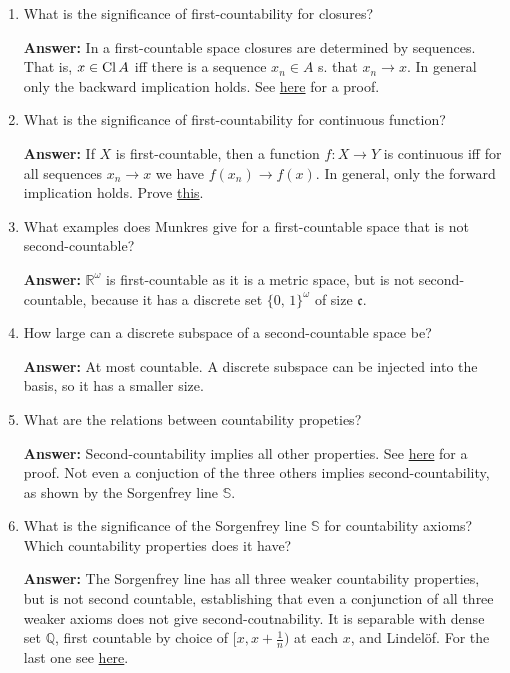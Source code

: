 \begin{enumerate}
    \item What is the significance of first-countability for closures?

    \textbf{Answer:} In a first-countable space closures are determined by sequences. That is, \( x \in \operatorname{Cl} A \) iff there is a sequence \( x_n \in A \) s. that \( x_n \to x \). In general only the backward implication holds. See \hyperlink{FirstCountableClosures}{here} for a proof.

    \item What is the significance of first-countability for continuous function?

    \textbf{Answer:} If \( X \) is first-countable, then a function \( f: X \to Y \) is continuous iff for all sequences \( x_n \to x \) we have \( f(x_n) \to f(x) \). In general, only the forward implication holds. Prove \hyperlink{FirstCountableContinuousFunctions}{this}.
    
    \item What examples does Munkres give for a first-countable space that is not second-countable?

        \textbf{Answer:} \( \mathbb{R}^\omega \) is first-countable as it is a metric space, but is not second-countable, because it has a discrete set \( \{ 0,\,1 \}^\omega \) of size \( \mathfrak{c} \).
    \item How large can a discrete subspace of a second-countable space be?
    
    \textbf{Answer:} At most countable. A discrete subspace can be injected into the basis, so it has a smaller size.
    \item What are the relations between countability propeties?

    \textbf{Answer:} Second-countability implies all other properties. See \hyperlink{MetrisableSpaceCountabilityProperties}{here} for a proof. Not even a conjuction of the three others implies second-countability, as shown by the Sorgenfrey line \( \mathbb{S} \).
    \item What is the significance of the Sorgenfrey line \( \mathbb{S} \) for countability axioms? Which countability properties does it have?

        \textbf{Answer: } The Sorgenfrey line has all three weaker countability properties, but is not second countable, establishing that even a conjunction of all three weaker axioms does not give second-coutnability. It is separable with dense set \( \mathbb{Q} \), first countable by choice of \( [x, x + \frac{1}{n}) \) at each \( x \), and Lindel\"of. For the last one see \hyperlink{SorgenfreyLineLindelof}{here}.


\end{enumerate}
